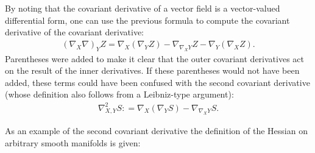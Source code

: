     \begin{result}
        By noting that the covariant derivative of a vector field is a vector-valued differential form, one can use the previous formula to compute the covariant derivative of the covariant derivative:
        \begin{gather}
            (\nabla_X\nabla)_YZ = \nabla_X(\nabla_YZ) - \nabla_{\nabla_XY}Z - \nabla_Y(\nabla_XZ).
        \end{gather}
        Parentheses were added to make it clear that the outer covariant derivatives act on the result of the inner derivatives. If these parentheses would not have been added, these terms could have been confused with the second covariant derivative (whose definition also follows from a Leibniz-type argument):
        \begin{gather}
            \nabla^2_{X,Y}S : = \nabla_X(\nabla_YS) - \nabla_{\nabla_XY}S.
        \end{gather}
    \end{result}

    As an example of the second covariant derivative the definition of the Hessian on arbitrary smooth manifolds is given:

